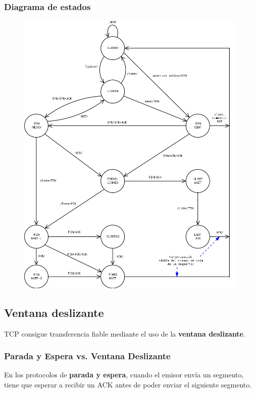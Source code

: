 \subsubsection{Diagrama de estados}
\begin{figure}[H]
    \centering
    \includegraphics[width=0.98\textwidth]{img/EstadosTCP.png}
\end{figure}
\newpage
\subsection{Ventana deslizante}
TCP consigue transferencia fiable mediante el uso de la \textbf{ventana deslizante}.
\subsubsection{Parada y Espera vs. Ventana Deslizante}
En los protocolos de \textbf{parada y espera}, cuando el emisor envía un segmento, tiene que esperar a recibir un ACK antes de poder enviar el siguiente segmento.\\

